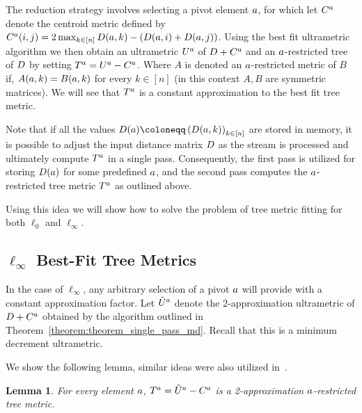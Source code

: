 \documentclass{article}
\newtheorem{lemma}[theorem]{Lemma}
\begin{document}
The reduction strategy involves selecting a pivot element $a$, for which let $C^a$ denote the centroid metric defined by $C^a (i,j) = 2\max_{k \in [n]}D (a,k) - (D (a,i) + D (a,j))$. Using the best fit ultrametric algorithm we then obtain an ultrametric $U^a$ of $D + C^a$ and an $a$-restricted tree of $D$ by setting $T^a = U^a - C^a$.
Where $A$ is denoted an $a$-restricted metric of $B$ if, $A (a,k)=B (a,k)$ for every $k \in [n]$ (in this context $A,B$ are symmetric matrices). We will see that $T^a$ is a constant approximation to the best fit tree metric.

Note that if all the values $\inputmatrix(\apivot) \coloneqq \left(\inputmatrix (\apivot,k) \right)_{k \in [n]}$ are stored in memory, it is possible to adjust the input distance matrix $D$ as the stream is processed and ultimately compute $T^a$ in a single pass. Consequently, the first pass is utilized for storing $D (a)$ for some predefined $a$, and the second pass computes the $a$-restricted tree metric $T^a$ as outlined above.

Using this idea we will show how to solve the problem of tree metric fitting for both $\ell_0$ and $\ell_\infty$.

\subsection{\texorpdfstring{$\ell_\infty$ Best-Fit Tree Metrics}{l-infty Best-Fit Tree Metrics}} 
In the case of $\ell_\infty$, any arbitrary selection of a pivot $a$ will provide with a constant approximation factor. 
Let $\tilde{U}^a$ denote the 2-approximation ultrametric of $D+C^a$ obtained by the algorithm outlined in Theorem~\ref{theorem:theorem_single_pass_md}. Recall that this is a minimum decrement ultrametric.

We show the following lemma, similar ideas were also utilized in~\cite{agarwala}. 

\begin{lemma}\label{lemma:linf_tree_metric}
For every element $a$, $T^a = \tilde{U}^a - C^a$ is a 2-approximation $a$-restricted tree metric.
\end{lemma}
\end{document}
